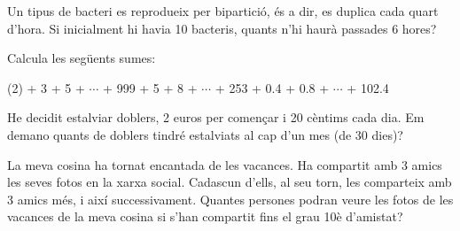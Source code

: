 \begin{mylist}
	\item Un tipus de bacteri es reprodueix per bipartició, és a dir, es duplica cada quart d'hora. Si inicialment hi havia 10 bacteris, quants n'hi haurà passades 6 hores?
	
	\item Calcula les següents sumes:
	\begin{tasks}(2)
		 + 3 + 5 + $\cdots$ + 999
		 + 5 + 8 + $\cdots$ + 253
		 + 0.4 + 0.8 + $\cdots$ + 102.4
	\end{tasks}


	\item He decidit estalviar doblers, 2 euros per començar i 20 cèntims cada dia. Em demano quants de doblers tindré estalviats al cap d'un mes (de 30 dies)?
	
	
	\item La meva cosina ha tornat encantada de les vacances. Ha compartit amb 3 amics les seves fotos en la xarxa social. Cadascun d'ells, al seu torn, les comparteix amb 3 amics més, i així successivament. Quantes persones podran veure les fotos de les vacances de la meva cosina si s'han compartit fins el grau 10è d'amistat?
	
	
\end{mylist}


